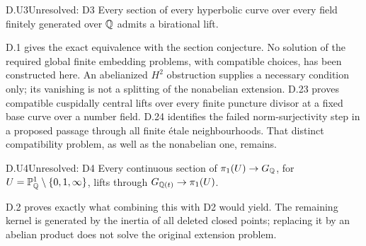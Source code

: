 \begin{claim}{D.U3}{Unresolved: D3}
Every section of every hyperbolic curve over every field finitely
generated over $\mathbb Q$ admits a birational lift.
\end{claim}
D.1 gives the exact equivalence with the section conjecture. No
solution of the required global finite embedding problems, with
compatible choices, has been constructed here. An abelianized
$H^2$ obstruction supplies a necessary condition only; its
vanishing is not a splitting of the nonabelian extension.
D.23 proves compatible cuspidally central lifts over every finite
puncture divisor at a fixed base curve over a number field.
D.24 identifies the failed norm-surjectivity step in a proposed
passage through all finite \'etale neighbourhoods. That distinct
compatibility problem, as well as the nonabelian one, remains.

\begin{claim}{D.U4}{Unresolved: D4}
Every continuous section of $\pi_1(U)\to G_\mathbb Q$, for
$U=\mathbb P^1_\mathbb Q\setminus\{0,1,\infty\}$, lifts through
$G_{\mathbb Q(t)}\to\pi_1(U)$.
\end{claim}
D.2 proves exactly what combining this with D2 would yield.
The remaining kernel is generated by the inertia of all deleted
closed points; replacing it by an abelian product does not solve
the original extension problem.

